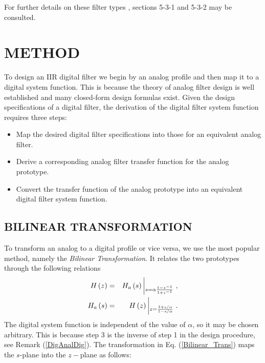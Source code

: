 \documentclass{sebase}
\begin{document}
For further details on these filter types \cite{Mitra}, sections 5-3-1 and
5-3-2 may be consulted.

\section{METHOD}

To design an IIR digital filter we begin by an analog profile and then map
it to a digital system function. This is because the theory of analog filter
design is well established and many closed-form design formulas exist. Given
the design specifications of a digital filter, the derivation of the digital
filter system function requires three steps:

\begin{itemize}
\item Map the desired digital filter specifications into those for an
equivalent analog filter.

\item Derive a corresponding analog filter transfer function for the analog
prototype.

\item Convert the transfer function of the analog prototype into an
equivalent digital filter system function.
\end{itemize}


\subsection{BILINEAR TRANSFORMATION}

To transform an analog to a digital profile or vice versa, we use the most
popular method, namely the \textit{Bilinear Transformation}. It relates the
two prototypes through the following relations 
\begin{eqnarray}
H\left( z\right) &=&H_{a}\left( s\right) \left| _{s=\alpha \frac{1-z^{-1}}{%
1+z^{-1}}}\right. ,  \label{Bilinear_Trans} \\
H_{a}\left( s\right) &=&H\left( z\right) \left| _{z=\frac{1+s/\alpha }{%
1-s/\alpha }}\right. .  \label{Bilinear_Inverse_Trans}
\end{eqnarray}
The digital system function is independent of the value of $\alpha $, so it
may be chosen arbitrary. This is because step 3 is the inverse of step 1 in
the design procedure, see Remark (\ref{DigAnalDig}). The transformation in
Eq. (\ref{Bilinear_Trans}) maps the $s$-plane into the $z-$plane as follows:
\end{document}
